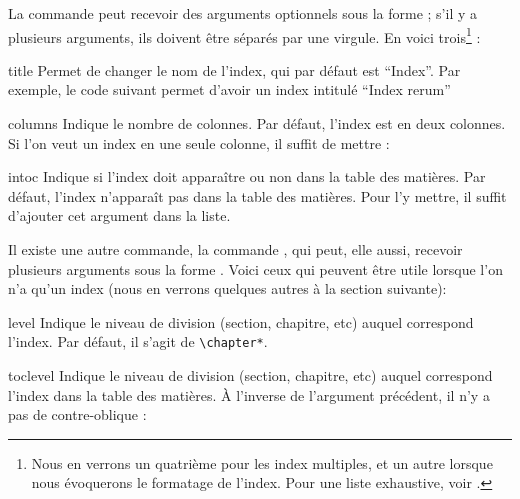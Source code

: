 La commande  peut recevoir des arguments optionnels sous la forme  ; s'il y a plusieurs arguments, ils doivent être séparés par une virgule. En voici trois\footnote{Nous en verrons un quatrième pour les index multiples, et un autre lorsque nous évoquerons le formatage de l'index. Pour une liste exhaustive, voir \cite{indextools}.} :
\begin{choix}
\item[title] Permet de changer le nom de l'index, qui par défaut est \enquote{Index}. Par exemple, le code suivant permet d'avoir un index intitulé \enquote{Index rerum} 

\begin{latexcode}
\makeindex[title = Index rerum]
\end{latexcode}

\item[columns] Indique le nombre de colonnes. Par défaut, l'index est en deux colonnes. Si l'on veut un index en une seule colonne, il suffit  de mettre  :

\begin{latexcode}
\makeindex[title = Index rerum, columns = 1]
\end{latexcode}

\item[intoc] Indique si l'index doit apparaître ou non dans la table des matières. Par défaut, l'index n'apparaît pas dans la table des matières. Pour l'y mettre, il suffit d'ajouter cet argument dans la liste. 

\begin{latexcode}
\makeindex[title = Index rerum, columns = 1, intoc]
\end{latexcode}
\end{choix}

Il existe une autre commande, la commande , qui peut, elle aussi, recevoir plusieurs arguments sous la forme
. Voici ceux qui peuvent être utile lorsque l'on n'a qu'un index (nous en verrons quelques autres à la section suivante):
\begin{choix}
\item[level] Indique le niveau de division (section, chapitre, etc) auquel correspond l'index. Par défaut, il s'agit de \verb|\chapter*|.
\item[toclevel] Indique le niveau de division (section, chapitre, etc) auquel correspond l'index dans la table des matières.  À l'inverse de l'argument précédent, il n'y a pas de contre-oblique :

\begin{latexcode}
\indexsetup[level=\section*, toclevel=section]
\end{latexcode}
\end{choix}


